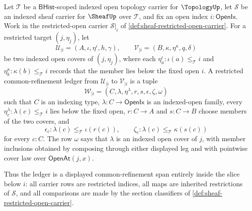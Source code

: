 \begin{definition}
\label{def:sheaf-restricted-common-refinement-ledger}
Let $\mathcal{T}$ be a $\mathsf{BHist}$-scoped indexed open topology carrier for $\TopologyUp$, let $\mathcal{S}$ be an indexed sheaf carrier for $\SheafUp$ over $\mathcal{T}$, and fix an open index $i:\mathsf{OpenIx}$. Work in the restricted-open carrier $\mathcal{S}|_i$ of \autoref{def:sheaf-restricted-open-carrier}. For a restricted target $(j,\eta_j)$, let
$$
\mathcal{U}_{|i}=(A,\iota,\eta^\iota,h,\gamma),
\qquad
\mathcal{V}_{|i}=(B,\kappa,\eta^\kappa,q,\delta)
$$
be two indexed open covers of $(j,\eta_j)$, where each $\eta^\iota_a:\iota(a)\le_{\mathcal{T}} i$ and $\eta^\kappa_b:\kappa(b)\le_{\mathcal{T}} i$ records that the member lies below the fixed open $i$. A restricted common-refinement ledger from $\mathcal{U}_{|i}$ to $\mathcal{V}_{|i}$ is a tuple
$$
\mathcal{W}_{|i}=(C,\lambda,\eta^\lambda,r,s,\epsilon,\zeta,\omega)
$$
such that $C$ is an indexing type, $\lambda:C\to\mathsf{OpenIx}$ is an indexed-open family, every $\eta^\lambda_c:\lambda(c)\le_{\mathcal{T}} i$ lies below the fixed open, $r:C\to A$ and $s:C\to B$ choose members of the two covers, and
$$
\epsilon_c:\lambda(c)\le_{\mathcal{T}}\iota(r(c)),
\qquad
\zeta_c:\lambda(c)\le_{\mathcal{T}}\kappa(s(c))
$$
for every $c:C$. The row $\omega$ says that $\lambda$ is an indexed open cover of $j$, with member inclusions obtained by composing through either displayed leg and with pointwise cover law over $\mathsf{OpenAt}(j,x)$.

Thus the ledger is a displayed common-refinement span entirely inside the slice below $i$: all carrier rows are restricted indices, all maps are inherited restrictions of $\mathcal{S}$, and all comparisons are made by the section classifiers of \autoref{def:sheaf-restricted-open-carrier}.
\end{definition}

